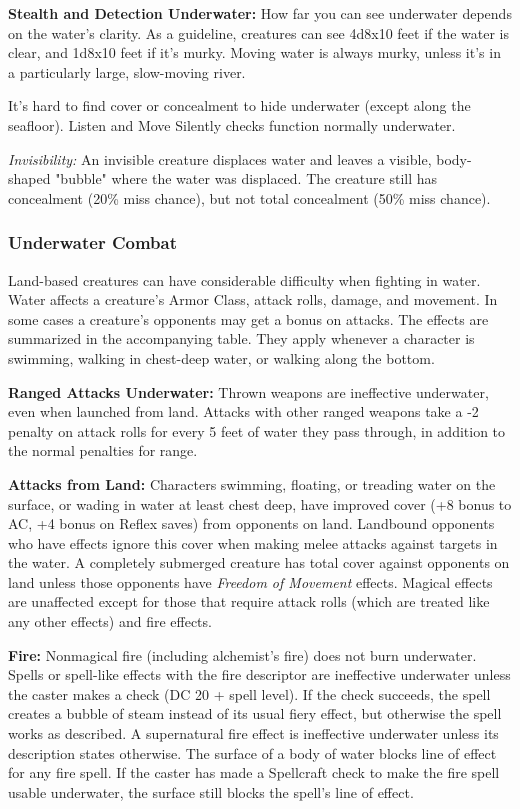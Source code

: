 \textbf{Stealth and Detection Underwater:} How far you can see underwater depends 
on the water's clarity. As a guideline, creatures can see 4d8x10 
feet if the water is clear, and 1d8x10 feet if it's murky. Moving 
water is always murky, unless it's in a particularly large, slow-moving river.

It's hard to find cover or concealment to hide underwater (except along the seafloor). 
Listen and Move Silently checks function normally underwater.

\textit{Invisibility:} An invisible creature displaces water and leaves a visible, 
body-shaped "bubble" where the water was displaced. The creature still has concealment 
(20\% miss chance), but not total concealment (50\% miss chance).

\subsubsection{Underwater Combat}

Land-based creatures can have considerable difficulty when fighting in water. Water 
affects a creature's Armor Class, attack rolls, damage, and movement. In some cases 
a creature's opponents may get a bonus on attacks. The effects are summarized in 
the accompanying table. They apply whenever a character is swimming, walking in 
chest-deep water, or walking along the bottom. 

\textbf{Ranged Attacks Underwater:} Thrown weapons are ineffective underwater, 
even when launched from land. Attacks with other ranged weapons take a -2 penalty 
on attack rolls for every 5 feet of water they pass through, in addition to the 
normal penalties for range. 

\textbf{Attacks from Land:} Characters swimming, floating, or treading water on 
the surface, or wading in water at least chest deep, have improved cover (+8 bonus 
to AC, +4 bonus on Reflex saves) from opponents on land. Landbound opponents who 
have  effects ignore this cover when making melee attacks 
against targets in the water. A completely submerged creature has total cover against 
opponents on land unless those opponents have \textit{Freedom of Movement} effects. 
Magical effects are unaffected except for those that require attack rolls (which 
are treated like any other effects) and fire effects.

\textbf{Fire:} Nonmagical fire (including alchemist's fire) does not burn underwater. 
Spells or spell-like effects with the fire descriptor are ineffective underwater 
unless the caster makes a  check (DC 20 + spell level). If the check 
succeeds, the spell creates a bubble of steam instead of its usual fiery effect, 
but otherwise the spell works as described. A supernatural fire effect is ineffective 
underwater unless its description states otherwise. The surface of a body of water 
blocks line of effect for any fire spell. If the caster has made a Spellcraft check 
to make the fire spell usable underwater, the surface still blocks the spell's 
line of effect.

